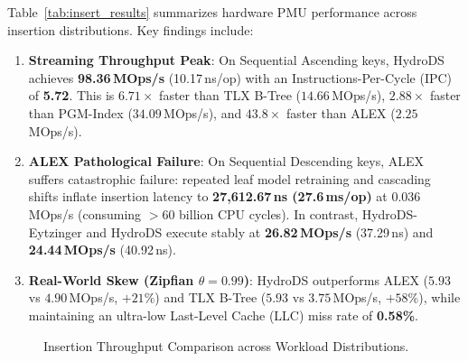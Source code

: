 \documentclass[10pt,twocolumn,letterpaper]{article}
\theoremstyle{definition}
\begin{document}
Table~\ref{tab:insert_results} summarizes hardware PMU performance across insertion distributions. Key findings include:
\begin{enumerate}
  \item \textbf{Streaming Throughput Peak}: On Sequential Ascending keys, HydroDS achieves \textbf{98.36\,MOps/s} (10.17\,ns/op) with an Instructions-Per-Cycle (IPC) of \textbf{5.72}. This is $6.71{\times}$ faster than TLX B-Tree ($14.66$\,MOps/s), $2.88{\times}$ faster than PGM-Index ($34.09$\,MOps/s), and $43.8{\times}$ faster than ALEX ($2.25$\,MOps/s).
  \item \textbf{ALEX Pathological Failure}: On Sequential Descending keys, ALEX suffers catastrophic failure: repeated leaf model retraining and cascading shifts inflate insertion latency to \textbf{27,612.67\,ns (27.6\,ms/op)} at 0.036\,MOps/s (consuming $>60$ billion CPU cycles). In contrast, HydroDS-Eytzinger and HydroDS execute stably at \textbf{26.82\,MOps/s} (37.29\,ns) and \textbf{24.44\,MOps/s} (40.92\,ns).
  \item \textbf{Real-World Skew (Zipfian $\theta{=}0.99$)}: HydroDS outperforms ALEX ($5.93$ vs $4.90$\,MOps/s, $+21\%$) and TLX B-Tree ($5.93$ vs $3.75$\,MOps/s, $+58\%$), while maintaining an ultra-low Last-Level Cache (LLC) miss rate of \textbf{0.58\%}.
\end{enumerate}

\begin{figure}[H]
\centering
{}
\caption{Insertion Throughput Comparison across Workload Distributions.}
\label{fig:insert_bar}
\end{figure}
\end{document}
